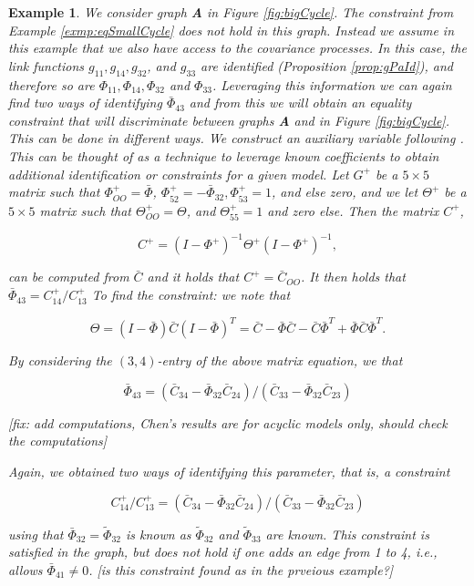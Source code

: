 \documentclass[accepted]{uai2021} %
\newtheorem{exmp}[thm]{Example}
\begin{document}
\begin{exmp}
	We consider graph \textbf{A} in Figure \ref{fig:bigCycle}. The constraint 
	from Example \ref{exmp:eqSmallCycle} does not hold in this graph. Instead 
	we assume in 
	this example that we also have access to the 
	covariance processes. In this case, the link functions 
	$g_{11},g_{14},g_{32}$, and $g_{33}$ are identified (Proposition 
	\ref{prop:gPaId}), and therefore so are $\Phi_{11}, \Phi_{14} , \Phi_{32}$ 
	and 
	$\Phi_{33}$.  Leveraging this information we can again find two ways of 
	identifying 
	$\bar{\Phi}_{43}$ and from this we will obtain an equality constraint that 
	will 
	discriminate between graphs \textbf{A} and  in 
	Figure \ref{fig:bigCycle}. This can be done in different ways. We 
	construct an {\it auxiliary 
	variable} following \cite{chenIJCAI2016, chenICML2017}. This can be thought 
	of as a technique to leverage known coefficients to obtain additional 
	identification or constraints for a given model. Let $G^+$ be a 
	$5\times 5$ 
	matrix such that $\Phi_{OO}^+ = \bar{\Phi}$, $\Phi_{52}^+ = 
	-\bar{\Phi}_{32}, \Phi_{53}^+ 
	= 1$, and else zero, and we let $\Theta^+$ be a $5\times 5$ matrix such 
	that $\Theta_{OO}^+ = \Theta$, and $\Theta_{55}^+ = 1$ and zero else. Then 
	the matrix $C^+$,
	
	$$
	C^+ = (I - \Phi^+)^{-1}\Theta^+(I-\Phi^+)^{-1},
	$$
	
	can be computed from $\bar{C}$ and it holds that 
	$C^+=\bar{C}_{OO}$. It then holds that $\bar{\Phi}_{43} = 
	C_{14}^+/C_{13}^+$
	To find the constraint: we note that
	
	$$
	\Theta = (I - \bar{\Phi})\bar{C}(I-\bar{\Phi})^T = \bar{C} - 
	\bar{\Phi}\bar{C} - \bar{C}\bar{\Phi}^T + 
	\bar{\Phi}\bar{C}\bar{\Phi}^T.
	$$
	
	By considering the $(3,4)$-entry of the above matrix equation, we that
	
	$$
	\bar{\Phi}_{43} = (\bar{C}_{34} - 
	\bar{\Phi}_{32}\bar{C}_{24})/(\bar{C}_{33} - 
	\bar{\Phi}_{32}\bar{C}_{23})
	$$
	
	[fix: add computations, Chen's results are for acyclic models only, should 
	check the computations]
	
	
 Again, we obtained two ways of identifying 
 this parameter, that is, a constraint
 
 $$
 C_{14}^+/C_{13}^+ = (\bar{C}_{34} - 
 \bar{\Phi}_{32}\bar{C}_{24})/(\bar{C}_{33} - 
 \bar{\Phi}_{32}\bar{C}_{23})
 $$
 
 using that $\bar{\Phi}_{32} = \tilde{\Phi}_{32}$ is known as 
 $\tilde{\Phi}_{32}$ and 
 $\tilde{\Phi}_{33}$ are known. This constraint is satisfied in the graph, 
 but 
 does not hold if one adds an edge from 1 to 
 4, i.e., allows $\bar{\Phi}_{41} \neq 0$. [is this constraint found as in 
 the 
 prveious example?]
\end{exmp}
\end{document}
